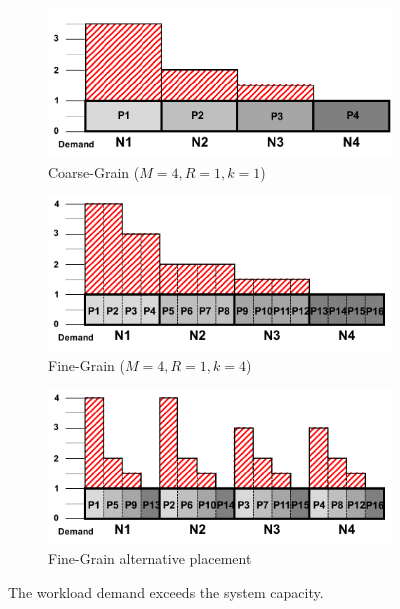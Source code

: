 \begin{figure}[!htbp]
\begin{subfigure}[b]{0.75\textwidth}
    \includegraphics[width=\linewidth]{figures/dp_final_before_coarse.pdf}
    \caption{Coarse-Grain ($M=4,R=1,k=1$)}
    \label{fig:dp_before_coarse}
\end{subfigure}
\begin{subfigure}[b]{0.75\textwidth}
    \includegraphics[width=\linewidth]{figures/dp_final_before_fine.pdf}
    \caption{Fine-Grain ($M=4,R=1,k=4$)}
    \label{fig:dp_before_fine}
\end{subfigure}
\begin{subfigure}[b]{0.75\textwidth}
    \includegraphics[width=\linewidth]{figures/dp_final_before_fine_R1.pdf}
    \caption{Fine-Grain alternative placement}
    \label{fig:dp_before_fine_placement}
\end{subfigure}
\centering
\caption{The workload demand exceeds the system capacity.}
\label{fig:dp_before}
\end{figure}



